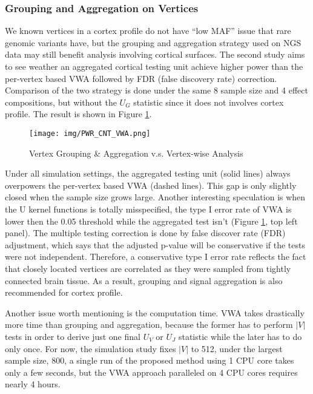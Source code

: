 \subsubsection{Grouping and Aggregation on Vertices}
We known vertices in a cortex profile do not have ``low MAF'' issue that rare genomic variants have, but the grouping and aggregation strategy used on NGS data may still benefit analysis involving cortical surfaces. The second study aims to see weather an aggregated cortical testing unit achieve higher power than the per-vertex based VWA followed by FDR (false discovery rate) correction. Comparison of the two strategy is done under the same 8 sample size and 4 effect compositions, but without the $U_G$ statistic since it does not involves cortex profile. The result is shown in Figure \ref{fig:PWR_CNT_VWA}.
\begin{figure}[!htbp]
\centering
\texttt{[image: img/PWR\_CNT\_VWA.png]}
\caption{Vertex Grouping \& Aggregation v.s. Vertex-wise Analysis}
\label{fig:PWR_CNT_VWA}
\end{figure}
Under all simulation settings, the aggregated testing unit (solid lines) always overpowers the per-vertex based VWA (dashed lines). This gap is only slightly closed when the sample size grows large. Another interesting speculation is when the U kernel functions is totally misspecified, the type I error rate of VWA is lower then the 0.05 threshold while the aggregated test isn't (Figure \ref{fig:PWR_CNT_VWA}, top left panel). The multiple testing correction is done by false discover rate (FDR) adjustment, which says that the adjusted p-value will be conservative if the tests were not independent. Therefore, a conservative type I error rate reflects the fact that closely located vertices are correlated as they were sampled from tightly connected brain tissue. As a result, grouping and signal aggregation is also recommended for cortex profile.

Another issue worth mentioning is the computation time. VWA takes drastically more time than grouping and aggregation, because the former has to perform $|V|$ tests in order to derive just one final $U_V$ or $U_J$ statistic while the later has to do only once. For now, the simulation study fixes $|V|$ to 512, under the largest sample size, 800, a single run of the proposed method using 1 CPU core takes only a few seconds, but the VWA approach paralleled on 4 CPU cores requires nearly 4 hours.

